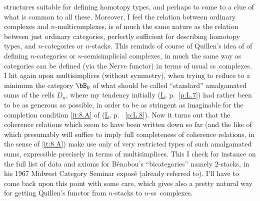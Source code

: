 structures suitable for defining homotopy types, and perhaps to come
to a clue of what is common to all these. Moreover, I feel the
relation between ordinary complexes and $n$-multicomplexes, is of much
the same nature as the relation between just ordinary categories,
perfectly sufficient for describing homotopy types, and $n$-categories
or $n$-stacks. This reminds of course of Quillen's idea of
of defining $n$-categories or $n$-semisimplicial complexes, in much the same way as categories can be
defined (via the Nerve functor) in terms of usual ss~complexes. I hit
again upon multisimplices (without symmetry), when trying to reduce to
a minimum the category $\bB_0$ of what should be called ``standard''
amalgamated sums of the cells $D_n$, where my tendency initially
(\hyperref[ch:I]L, p.~\ref{p:L.7}) had rather been to be as generous
as possible, in order to be as stringent as imaginable for the
completion condition \ref{it:8.A} of (\hyperref[ch:I]L, p.~%
\ref{p:L.8}).  Now it turns out that the coherence relations which
seem to have been written down so far (and the like of which
presumably will suffice to imply full completeness of coherence
relations, in the sense of \ref{it:8.A}) make use only of very
restricted types of such amalgamated sums, expressible precisely in
terms of multisimplices. This I check for instance on the full list of
data and axioms for B\'enabou's ``bicategories'' namely $2$-stacks, in
his 1967 Midwest Category Seminar expos\'e (already referred to). I'll
have to come back upon this point with some care, which gives also a
pretty natural way for getting Quillen's functor from $n$-stacks to
$n$-ss~complexes.

